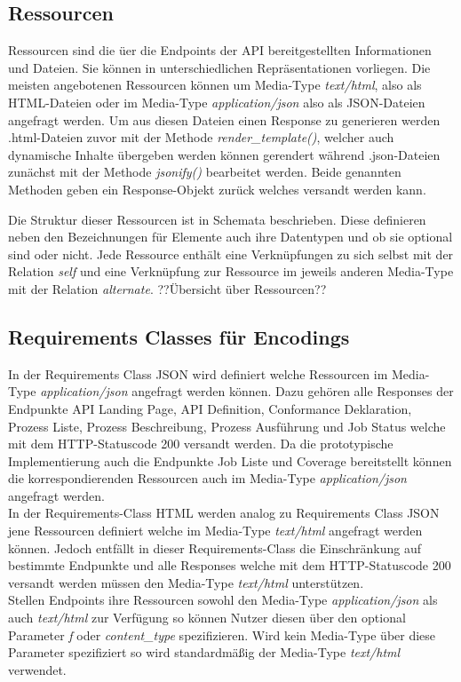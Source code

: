 \subsection{Ressourcen}
Ressourcen sind die üer die Endpoints der API bereitgestellten Informationen und Dateien. Sie können in unterschiedlichen Repräsentationen vorliegen.
Die meisten angebotenen Ressourcen können um Media-Type \textit{text/html}, also als HTML-Dateien oder im Media-Type \textit{application/json} also als 
JSON-Dateien angefragt werden. Um aus diesen Dateien einen Response zu generieren werden .html-Dateien zuvor mit der Methode \textit{render\_template()}, welcher auch 
dynamische Inhalte übergeben werden können gerendert während .json-Dateien zunächst mit der Methode \textit{jsonify()} bearbeitet werden. Beide genannten Methoden
geben ein Response-Objekt zurück welches versandt werden kann.  

Die Struktur dieser Ressourcen ist in Schemata beschrieben. Diese definieren neben den Bezeichnungen für Elemente auch ihre Datentypen und 
ob sie optional sind oder nicht. Jede Ressource enthält eine Verknüpfungen zu sich selbst mit der Relation \textit{self} und eine Verknüpfung 
zur Ressource im jeweils anderen Media-Type mit der Relation \textit{alternate}. ??Übersicht über Ressourcen??

\subsection{Requirements Classes für Encodings}
In der Requirements Class JSON wird definiert welche Ressourcen im Media-Type \textit{application/json} angefragt werden können. Dazu gehören alle Responses der 
Endpunkte API Landing Page, API Definition, Conformance Deklaration, Prozess Liste, Prozess Beschreibung, Prozess Ausführung und Job Status welche mit dem 
HTTP-Statuscode 200 versandt werden. Da die prototypische Implementierung auch die Endpunkte Job Liste und Coverage bereitstellt können die korrespondierenden
Ressourcen auch im Media-Type \textit{application/json} angefragt werden.\\

In der Requirements-Class HTML werden analog zu Requirements Class JSON jene Ressourcen definiert welche im Media-Type \textit{text/html} angefragt werden können. Jedoch
entfällt in dieser Requirements-Class die Einschränkung auf bestimmte Endpunkte und alle Responses welche mit dem HTTP-Statuscode 200 versandt werden müssen den 
Media-Type \textit{text/html} unterstützen.\\
Stellen Endpoints ihre Ressourcen sowohl den Media-Type \textit{application/json} als auch \textit{text/html} zur Verfügung so können Nutzer diesen über den optional Parameter
\textit{f} oder \textit{content\_type} spezifizieren. Wird kein Media-Type über diese Parameter spezifiziert so wird standardmäßig der Media-Type \textit{text/html} verwendet. \\


